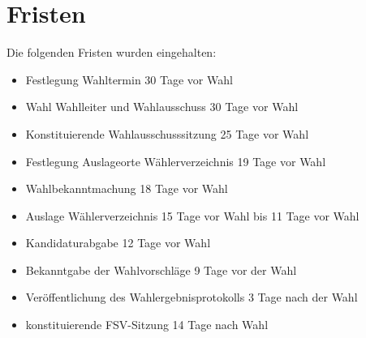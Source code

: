\documentclass[a4paper]{scrartcl}
\begin{document}
\section{Fristen}

Die folgenden Fristen wurden eingehalten:

\begin{itemize}[label=$\Box$]
\item Festlegung Wahltermin 30 Tage vor Wahl
\item Wahl Wahlleiter und Wahlausschuss 30 Tage vor Wahl
\item Konstituierende Wahlausschusssitzung 25 Tage vor Wahl
\item Festlegung Auslageorte Wählerverzeichnis 19 Tage vor Wahl
\item Wahlbekanntmachung 18 Tage vor Wahl
\item Auslage Wählerverzeichnis 15 Tage vor Wahl bis 11 Tage vor Wahl
\item Kandidaturabgabe 12 Tage vor Wahl
\item Bekanntgabe der Wahlvorschläge 9 Tage vor der Wahl
\item Veröffentlichung des Wahlergebnisprotokolls 3 Tage nach der Wahl
\item konstituierende FSV-Sitzung 14 Tage nach Wahl
\end{itemize}









\end{document}
